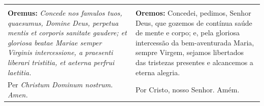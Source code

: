 \documentclass[a4paper,14pt]{extarticle} \usepackage[utf8]{inputenc}
\begin{document}
\begin{center}
\begin{longtable}{p{}|p{}}
\multicolumn{2}{p{0.96\textwidth}}{} \\
\textbf{Oremus:} \textit{Concede nos famulos tuos, quaesumus, Domine Deus, perpetua mentis et corporis sanitate gaudere; et gloriosa beatae Mariae semper Virginis intercessione, a praesenti liberari tristitia, et aeterna perfrui laetitia.} & \textbf{Oremos:} Concedei, pedimos, Senhor Deus, que gozemos de contínua saúde de mente e corpo; e, pela gloriosa intercessão da bem-aventurada Maria, sempre Virgem, sejamos libertados das tristezas presentes e alcancemos a eterna alegria. \\
Per \textit{Christum Dominum nostrum. Amen.} & Por Cristo, nosso Senhor. Amém. \\
\hline
\end{longtable}
\end{center}
\end{document}
